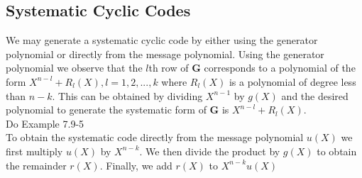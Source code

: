 \documentclass[fontsize=12pt]{article}
\begin{document}
  \subsection{Systematic Cyclic Codes}
  We may generate a systematic cyclic code by either using the generator polynomial or directly from the message polynomial. Using the generator polynomial we observe that the $l$th row of $\mathbf{G}$ corresponds to a polynomial of the form $X^{n-l} + R_l(X), l=1,2,...,k$ where $R_l(X)$ is a polynomial of degree less than $n-k$. This can be obtained by dividing $X^{n-1} $ by $g(X)$ and the desired polynomial to generate the systematic form of $\mathbf{G}$ is $X^{n-l} + R_l(X)$.  \\
  Do Example 7.9-5\\
  To obtain the systematic code directly from the message polynomial $u(X)$ we first multiply $u(X)$ by $X^{n-k}$. We then divide the product by $g(X)$ to obtain the remainder $r(X)$. Finally, we add $r(X)$ to $X^{n-k}u(X)$
 
\end{document}
